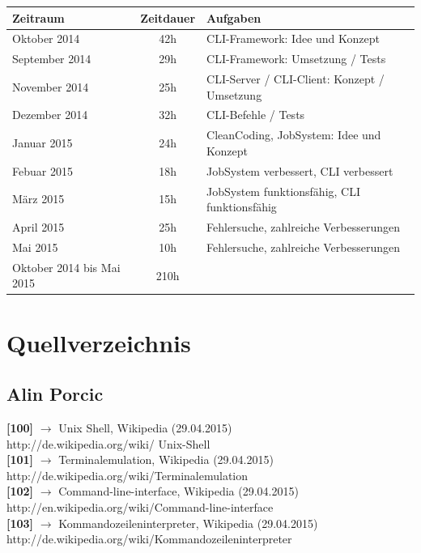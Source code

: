 \documentclass[12pt,a4paper]{report}
\begin{document}
\begin{onehalfspace}
\begin{center}
\begin{tabular}{|l|c|l|}
\hline
\textbf{Zeitraum} & \textbf{Zeitdauer} & \textbf{Aufgaben} \\ \hline
Oktober 2014 & 42h & CLI-Framework: Idee und Konzept\\
September 2014 & 29h & CLI-Framework: Umsetzung / Tests\\
November 2014 & 25h & CLI-Server / CLI-Client: Konzept / Umsetzung\\
Dezember 2014 & 32h & CLI-Befehle / Tests\\
Januar 2015 & 24h & CleanCoding, JobSystem: Idee und Konzept\\
Febuar 2015 & 18h & JobSystem verbessert, CLI verbessert\\
März 2015 & 15h & JobSystem funktionsfähig, CLI funktionsfähig\\
April 2015 & 25h & Fehlersuche, zahlreiche Verbesserungen \\
Mai 2015 & 10h & Fehlersuche, zahlreiche Verbesserungen\\
\hline \hline
Oktober 2014 bis Mai 2015 & 210h &\\ \hline

\end{tabular}
\end{center}

\part{Quellverzeichnis}

\chapter{Alin Porcic}

\noindent
\textbf{[100]} $\rightarrow$ Unix Shell, Wikipedia (29.04.2015)\\
http://de.wikipedia.org/wiki/ Unix-Shell\\

\noindent
\textbf{[101]} $\rightarrow$ Terminalemulation, Wikipedia (29.04.2015)\\
http://de.wikipedia.org/wiki/Terminalemulation\\

\noindent
\textbf{[102]} $\rightarrow$ Command-line-interface, Wikipedia (29.04.2015)\\
http://en.wikipedia.org/wiki/Command-line-interface\\

\noindent
\textbf{[103]} $\rightarrow$ Kommandozeileninterpreter, Wikipedia (29.04.2015)\\
http://de.wikipedia.org/wiki/Kommandozeileninterpreter\\


\end{onehalfspace}
\end{document}
